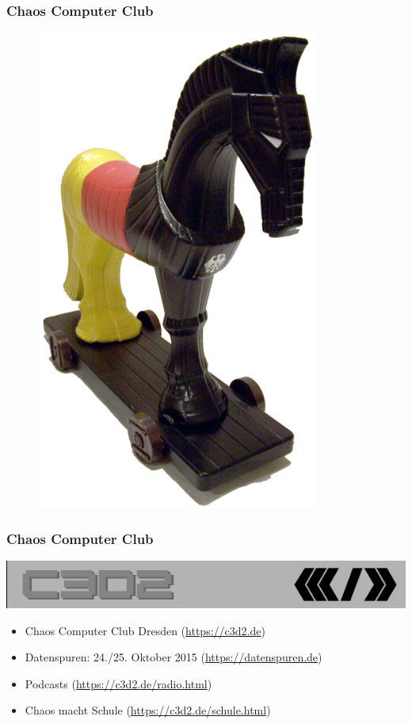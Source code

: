 \documentclass[12pt]{beamer}
\begin{document}
\begin{frame}
  \frametitle{Chaos Computer Club}
  \begin{figure}
    \includegraphics[height=0.7\textheight]{img/trojaner.png}
  \end{figure}
\end{frame}

\begin{frame}
    \frametitle{Chaos Computer Club}
    \begin{center}
	\includegraphics[height=0.1\textheight]{img/c3d2_logo.png}
    \end{center}
    \begin{itemize}
      \item<1-> Chaos Computer Club Dresden (\url{https://c3d2.de})          
      \item<2-> Datenspuren: 24./25. Oktober 2015 (\url{https://datenspuren.de})
      \item<3-> Podcasts (\url{https://c3d2.de/radio.html})
      \item<4-> Chaos macht Schule (\url{https://c3d2.de/schule.html})
    \end{itemize}
\end{frame}
\end{document}
